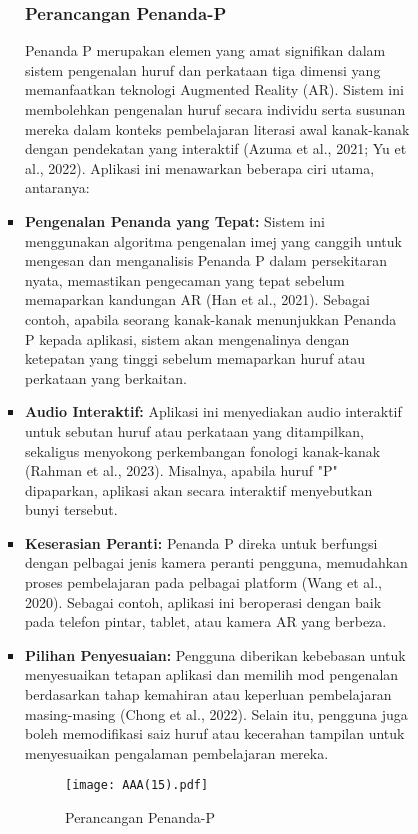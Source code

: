 \begin{itemize}
\begin{itemize}
\begin{itemize}
\begin{itemize}
\begin{itemize}
\subsubsection{Perancangan Penanda-P}  
Penanda P merupakan elemen yang amat signifikan dalam sistem pengenalan huruf dan perkataan tiga dimensi yang memanfaatkan teknologi Augmented Reality (AR). Sistem ini membolehkan pengenalan huruf secara individu serta susunan mereka dalam konteks pembelajaran literasi awal kanak-kanak dengan pendekatan yang interaktif (Azuma et al., 2021; Yu et al., 2022). Aplikasi ini menawarkan beberapa ciri utama, antaranya:  \\  

\item \textbf{Pengenalan Penanda yang Tepat:} Sistem ini menggunakan algoritma pengenalan imej yang canggih untuk mengesan dan menganalisis Penanda P dalam persekitaran nyata, memastikan pengecaman yang tepat sebelum memaparkan kandungan AR (Han et al., 2021). Sebagai contoh, apabila seorang kanak-kanak menunjukkan Penanda P kepada aplikasi, sistem akan mengenalinya dengan ketepatan yang tinggi sebelum memaparkan huruf atau perkataan yang berkaitan.\\  
\item \textbf{Audio Interaktif:} Aplikasi ini menyediakan audio interaktif untuk sebutan huruf atau perkataan yang ditampilkan, sekaligus menyokong perkembangan fonologi kanak-kanak (Rahman et al., 2023). Misalnya, apabila huruf "P" dipaparkan, aplikasi akan secara interaktif menyebutkan bunyi tersebut.\\  
\item \textbf{Keserasian Peranti:} Penanda P direka untuk berfungsi dengan pelbagai jenis kamera peranti pengguna, memudahkan proses pembelajaran pada pelbagai platform (Wang et al., 2020). Sebagai contoh, aplikasi ini beroperasi dengan baik pada telefon pintar, tablet, atau kamera AR yang berbeza.\\  
\item \textbf{Pilihan Penyesuaian:} Pengguna diberikan kebebasan untuk menyesuaikan tetapan aplikasi dan memilih mod pengenalan berdasarkan tahap kemahiran atau keperluan pembelajaran masing-masing (Chong et al., 2022). Selain itu, pengguna juga boleh memodifikasi saiz huruf atau kecerahan tampilan untuk menyesuaikan pengalaman pembelajaran mereka.

\begin{figure}
    \centering
    \texttt{[image: AAA(15).pdf]}
    \caption{Perancangan Penanda-P}
    \label{fig:enter-label}
\end{figure}


\end{itemize}
\end{itemize}
\end{itemize}
\end{itemize}
\end{itemize}

